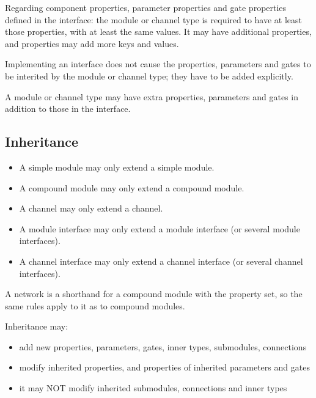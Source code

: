 Regarding component properties, parameter properties and gate properties
defined in the interface: the module or channel type is required to have at
least those properties, with at least the same values. It may have
additional properties, and properties may add more keys and values.

\begin{note}
  Implementing an interface does not cause the properties, parameters and
  gates to be interited by the module or channel type; they have to be added
  explicitly.
\end{note}

\begin{note}
  A module or channel type may have extra properties, parameters and gates
  in addition to those in the interface.
\end{note}



\subsection{Inheritance}
\label{ch-ned-ref:sec:inheritance}

\begin{itemize}
  \item A simple module may only extend a simple module.
  \item A compound module may only extend a compound module.
  \item A channel may only extend a channel.
  \item A module interface may only extend a module interface (or several module
        interfaces).
  \item A channel interface may only extend a channel interface (or several
        channel interfaces).
\end{itemize}

A network is a shorthand for a compound module with the 
property set, so the same rules apply to it as to compound modules.

Inheritance may:
\begin{itemize}
    \item add new properties, parameters, gates, inner types, submodules,
          connections
    \item modify inherited properties, and properties of inherited parameters and
          gates
    \item it may NOT modify inherited submodules, connections and inner types
\end{itemize}

